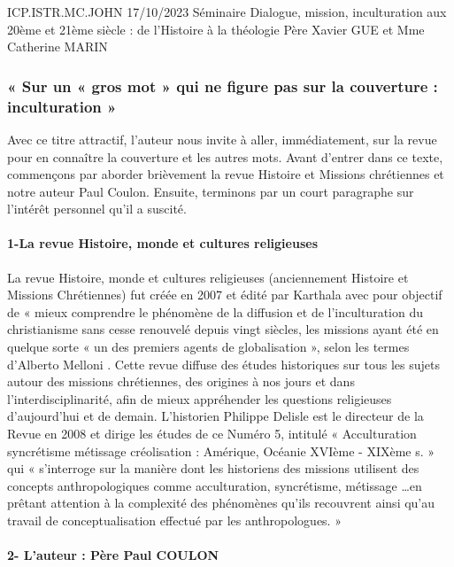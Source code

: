 ICP.ISTR.MC.JOHN 17/10/2023
Séminaire Dialogue, mission, inculturation aux 20ème et 21ème siècle : de l’Histoire à la théologie
 Père Xavier GUE et Mme Catherine MARIN 


\subsubsection{« Sur un « gros mot » qui ne figure pas sur la couverture : inculturation »}


Avec ce titre attractif, l’auteur nous invite à aller, immédiatement, sur la revue pour en connaître la couverture et les autres mots. 
Avant d’entrer dans ce texte, commençons par aborder brièvement la revue Histoire et Missions chrétiennes et notre auteur Paul Coulon. Ensuite, terminons par un court paragraphe sur l’intérêt personnel qu’il a suscité. 

\paragraph{1-La revue Histoire, monde et cultures religieuses}

La revue Histoire, monde et cultures religieuses (anciennement Histoire et Missions Chrétiennes) fut créée en 2007 et édité par Karthala avec pour objectif de « mieux comprendre le phénomène de la diffusion et de l’inculturation du christianisme sans cesse renouvelé depuis vingt siècles, les missions ayant été en quelque sorte « un des premiers agents de globalisation », selon les termes d’Alberto Melloni . 
Cette revue diffuse des études historiques sur tous les sujets autour des missions chrétiennes, des origines à nos jours et dans l’interdisciplinarité, afin de mieux appréhender les questions religieuses d’aujourd’hui et de demain. 
L’historien Philippe Delisle   est le directeur de la Revue en 2008 et dirige les études de ce Numéro 5, intitulé « Acculturation syncrétisme métissage créolisation : Amérique, Océanie XVIème - XIXème s. » qui « s’interroge sur la manière dont les historiens  des missions utilisent des concepts anthropologiques  comme acculturation, syncrétisme, métissage …en prêtant attention à la complexité des phénomènes qu’ils recouvrent ainsi qu’au travail de conceptualisation effectué par les anthropologues. » 


\paragraph{2- L’auteur : Père Paul COULON}

